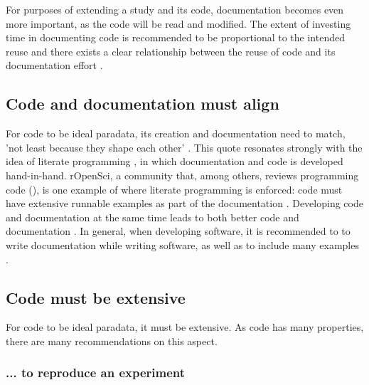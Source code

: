 For purposes of extending a study and its code, 
documentation becomes even more important,
as the code will be read and modified.
The extent of investing time in documenting code is recommended
to be proportional to the intended reuse \cite{pianosi2020successfully}
and there exists a clear relationship between the reuse 
of code and its documentation 
effort \cite{cosentino2017systematic,hata2015characteristics}.

\subsection{Code and documentation must align}

For code to be ideal paradata, 
its creation and documentation need to match, 
'not least because they shape each other' \cite{huvila2022improving}.
This quote resonates strongly with the idea of 
literate programming \cite{knuth1984literate},
in which documentation and code is developed hand-in-hand.
rOpenSci, a community that, among others, reviews programming
code (\cite{ram2013ropensci,ram2018community}), is 
one example of where literate programming is enforced:
code must have extensive runnable examples
as part of the documentation \cite{ropensci_2021_6619350}.
Developing code and documentation at the same time 
leads to both better code and documentation \cite{reenskaug1989environment}.
In general, when developing software, 
it is recommended to 
to write documentation while writing software,
as well as to include many examples \cite{lee2018ten}.


\subsection{Code must be extensive}

For code to be ideal paradata, it must be extensive.
As code has many properties, there are many recommendations on this aspect.

\subsubsection{... to reproduce an experiment}


